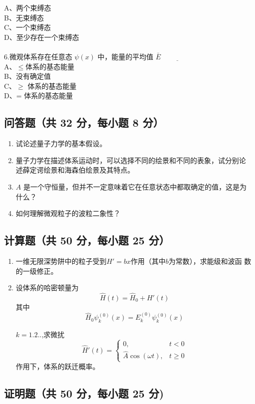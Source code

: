     A、两个束缚态\\
    B、无束缚态\\
    C、一个束缚态\\
    D、至少存在一个束缚态\\\\
6.微观体系存在任意态 $\psi(x)$ 中，能量的平均值 $\bar{E}\underline{\hspace{2cm}}$\\
    A、$\leq$体系的基态能量\\
    B、没有确定值\\
    C、$\geq$ 体系的基态能量 \\
    D、= 体系的基态能量\\
\subsection{问答题（共 32 分，每小题 8 分）}
\begin{enumerate}
\item 试论述量子力学的基本假设。
\item 量子力学在描述体系运动时，可以选择不同的绘景和不同的表象，试分别论
述薛定谔绘景和海森伯绘景及其特点。
\item $A$ 是一个守恒量，但并不一定意味着它在任意状态中都取确定的值，这是为
什么？
\item 如何理解微观粒子的波粒二象性？
\end{enumerate}
\subsection{计算题（共 50 分，每小题 25 分）}
\begin{enumerate}
\item 一维无限深势阱中的粒子受到$H' = bx$作用（其中$b$为常数），求能级和波函
数的一级修正。
\item 设体系的哈密顿量为 
\[
\hat{H}(t) = \hat{H}_0 + H'(t)~
\]
其中
\[
\hat{H}_0 \psi_k^{(0)}(x) = E_k^{(0)} \psi_k^{(0)}(x)~
\]

$k=1.2..$,求微扰
\[
\hat{H}'(t) = 
\begin{cases} 
0, & t < 0 \\
\hat{A} \cos(\omega t), & t \geq 0 
\end{cases}~
\]
作用下，体系的跃迁概率。

\end{enumerate}
\subsection{证明题（共 50 分，每小题 25 分)}
